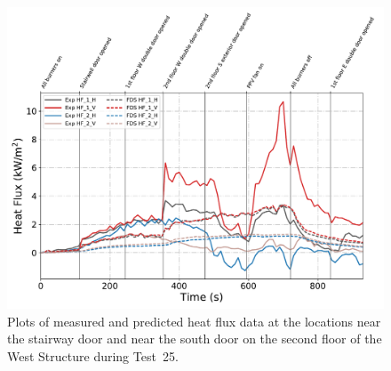 \begin{figure}[!h]
	\centering
	\includegraphics[width=\columnwidth]{Figures/Plots/Validation/Heat_Flux/Test_25_HFs}
	\caption[Plots of measured and predicted heat flux data during Test~25.]{Plots of measured and predicted heat flux data at the locations near the stairway door and near the south door on the second floor of the West Structure during Test~25.}
	\label{fig:Test25_HFs}
\end{figure}
